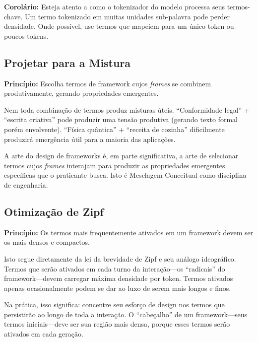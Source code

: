 \documentclass[12pt,a4paper]{article}
\begin{document}
\textbf{Corolário:} Esteja atento a como o tokenizador do modelo processa seus termos-chave.
Um termo tokenizado em muitas unidades sub-palavra pode perder densidade.
Onde possível, use termos que mapeiem para um único token ou poucos tokens.

\subsection{Projetar para a Mistura}
\label{subsec:blending-design}

\textbf{Princípio:} Escolha termos de framework cujos \textit{frames} se combinem produtivamente, gerando propriedades emergentes.

Nem toda combinação de termos produz misturas úteis.
``Conformidade legal'' + ``escrita criativa'' pode produzir uma tensão produtiva (gerando texto formal porém envolvente).
``Física quântica'' + ``receita de cozinha'' dificilmente produzirá emergência útil para a maioria das aplicações.

A arte do design de frameworks é, em parte significativa, a arte de selecionar termos cujos \textit{frames} interajam para produzir as propriedades emergentes específicas que o praticante busca.
Isto é Mesclagem Conceitual \cite{fauconnier2002} como disciplina de engenharia.

\subsection{Otimização de Zipf}
\label{subsec:zipf}

\textbf{Princípio:} Os termos mais frequentemente ativados em um framework devem ser os mais densos e compactos.

Isto segue diretamente da lei da brevidade de Zipf e seu análogo ideográfico.
Termos que serão ativados em cada turno da interação---os ``radicais'' do framework---devem carregar máxima densidade por token.
Termos ativados apenas ocasionalmente podem se dar ao luxo de serem mais longos e finos.

Na prática, isso significa: concentre seu esforço de design nos termos que persistirão ao longo de toda a interação.
O ``cabeçalho'' de um framework---seus termos iniciais---deve ser sua região mais densa, porque esses termos serão ativados em cada geração.


\end{document}
